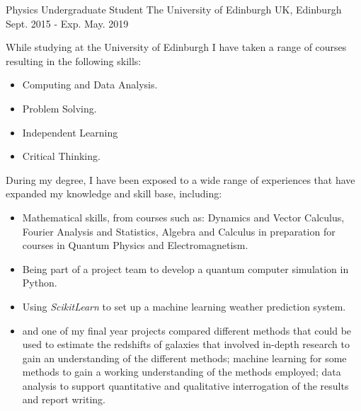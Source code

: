\begin{cventries}
 \cventry
    {Physics Undergraduate Student} %
    {The University of Edinburgh} %
    {UK, Edinburgh} %
    {Sept. 2015 - Exp. May. 2019} %
    {
      While studying at the University of Edinburgh I have taken a range of courses resulting in the following skills: 
      \begin{itemize}
          \item Computing and Data Analysis.
          \item Problem Solving.
          \item Independent Learning
          \item Critical Thinking.
      \end{itemize}
      During my degree, I have been exposed to a wide range of experiences that have expanded my knowledge and skill base, including:
      \begin{itemize}
          \item Mathematical skills, from courses such as: Dynamics and Vector Calculus, Fourier Analysis and Statistics, Algebra and Calculus in preparation for courses in Quantum Physics and Electromagnetism.
          \item Being part of a project team to develop a quantum computer simulation in Python.
          \item Using \textit{ScikitLearn} to set up a machine learning weather prediction system.
          \item and one of my final year projects compared different methods that could be used to estimate the redshifts of galaxies that involved in-depth research to gain an understanding of the different methods; machine learning for some methods to gain a working understanding of the methods employed; data analysis to support quantitative and qualitative interrogation of the results and report writing.
      \end{itemize}
      }
      


\end{cventries}
